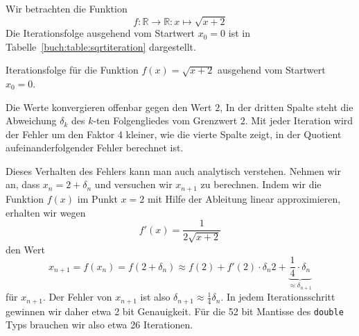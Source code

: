 \begin{beispiel}
\label{section:beispiel:sqrtiteration}
Wir betrachten die Funktion 
\[
f\colon \mathbb{R}\to\mathbb{R} : x\mapsto \sqrt{x+2}
\]
Die Iterationsfolge ausgehend vom Startwert $x_0=0$ ist in
Tabelle~\ref{buch:table:sqrtiteration} dargestellt.

\begin{table}
\centering
\renewcommand\arraystretch{1.15}

\caption{Iterationsfolge für die Funktion $f(x)=\sqrt{x+2}$ ausgehend
vom Startwert $x_0=0$.
\label{buch:table:sqrtiteration}}
\end{table}

Die Werte konvergieren offenbar gegen den Wert $2$, 
In der dritten Spalte steht die Abweichung $\delta_k$ des $k$-ten Folgengliedes
vom Grenzwert $2$.
Mit jeder Iteration wird der Fehler um den Faktor 4 kleiner, wie die
vierte Spalte zeigt, in der Quotient aufeinanderfolgender Fehler
berechnet ist.

Dieses Verhalten des Fehlers kann man auch analytisch verstehen.
Nehmen wir an, dass $x_n = 2 + \delta_n$ und versuchen wir 
$x_{n+1}$ zu berechnen.
Indem wir die Funktion $f(x)$ im Punkt $x=2$ mit Hilfe der Ableitung
linear approximieren, erhalten wir wegen
\[
f'(x) = \frac{1}{2\sqrt{x+2}}
\]
den Wert
\[
x_{n+1} = f(x_n) = f(2 + \delta_n)
\approx
f(2) + f'(2)\cdot \delta_n
2 + \underbrace{\frac14\cdot \delta_n}_{\displaystyle\approx\delta_{n+1}}
\]
für $x_{n+1}$.
Der Fehler von $x_{n+1}$ ist also $\delta_{n+1}\approx\frac14\delta_n$.
In jedem Iterationsschritt gewinnen wir daher etwa 2 bit Genauigkeit.
Für die 52 bit Mantisse des \texttt{double} Typs brauchen wir also
etwa 26 Iterationen.
\end{beispiel}

